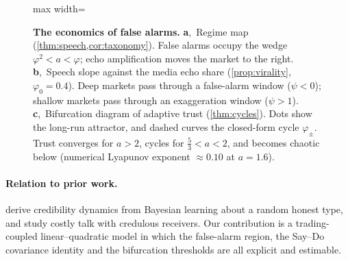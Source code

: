 \documentclass{article}
\theoremstyle{plain}
\theoremstyle{definition}
\theoremstyle{remark}
\begin{document}
\begin{figure}[t]
\begin{minipage}[t]{0.325\textwidth}
\begin{adjustbox}{max width=\linewidth}
\end{adjustbox}
\end{minipage}
\caption{\textbf{The economics of false alarms.} \textbf{a},~Regime map (\cref{thm:speech,cor:taxonomy}). False alarms occupy the wedge $\varphi^2<a<\varphi$; echo amplification moves the market to the right. \textbf{b},~Speech slope against the media echo share (\cref{prop:virality}, $\varphi_0=0.4$). Deep markets pass through a false-alarm window ($\psi<0$); shallow markets pass through an exaggeration window ($\psi>1$). \textbf{c},~Bifurcation diagram of adaptive trust (\cref{thm:cycles}). Dots show the long-run attractor, and dashed curves the closed-form cycle $\varphi_\pm$. Trust converges for $a>2$, cycles for $\tfrac53<a<2$, and becomes chaotic below (numerical Lyapunov exponent $\approx0.10$ at $a=1.6$).}
\label{fig:strategic}
\end{figure}

\paragraph{Relation to prior work.} \citet{benabou1992} derive credibility dynamics from Bayesian learning about a random honest type, and \citet{kartik2007} study costly talk with credulous receivers. Our contribution is a trading-coupled linear--quadratic model in which the false-alarm region, the Say--Do covariance identity and the bifurcation thresholds are all explicit and estimable.
\end{document}
